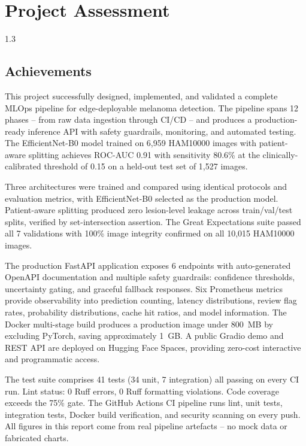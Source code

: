 
\chapter{Project Assessment}
\begin{spacing}{1.3}

\section{Achievements}

This project successfully designed, implemented, and validated a complete MLOps pipeline for edge-deployable melanoma detection. The pipeline spans 12 phases -- from raw data ingestion through CI/CD -- and produces a production-ready inference API with safety guardrails, monitoring, and automated testing. The EfficientNet-B0 model trained on 6,959 HAM10000 images with patient-aware splitting achieves ROC-AUC 0.91 with sensitivity 80.6\% at the clinically-calibrated threshold of 0.15 on a held-out test set of 1,527 images.

Three architectures were trained and compared using identical protocols and evaluation metrics, with EfficientNet-B0 selected as the production model. Patient-aware splitting produced zero lesion-level leakage across train/val/test splits, verified by set-intersection assertion. The Great Expectations suite passed all 7 validations with 100\% image integrity confirmed on all 10,015 HAM10000 images.

The production FastAPI application exposes 6 endpoints with auto-generated OpenAPI documentation and multiple safety guardrails: confidence thresholds, uncertainty gating, and graceful fallback responses. Six Prometheus metrics provide observability into prediction counting, latency distributions, review flag rates, probability distributions, cache hit ratios, and model information. The Docker multi-stage build produces a production image under 800~MB by excluding PyTorch, saving approximately 1~GB. A public Gradio demo and REST API are deployed on Hugging Face Spaces, providing zero-cost interactive and programmatic access.

The test suite comprises 41 tests (34 unit, 7 integration) all passing on every CI run. Lint status: 0 Ruff errors, 0 Ruff formatting violations. Code coverage exceeds the 75\% gate. The GitHub Actions CI pipeline runs lint, unit tests, integration tests, Docker build verification, and security scanning on every push. All figures in this report come from real pipeline artefacts -- no mock data or fabricated charts.


\end{spacing}
